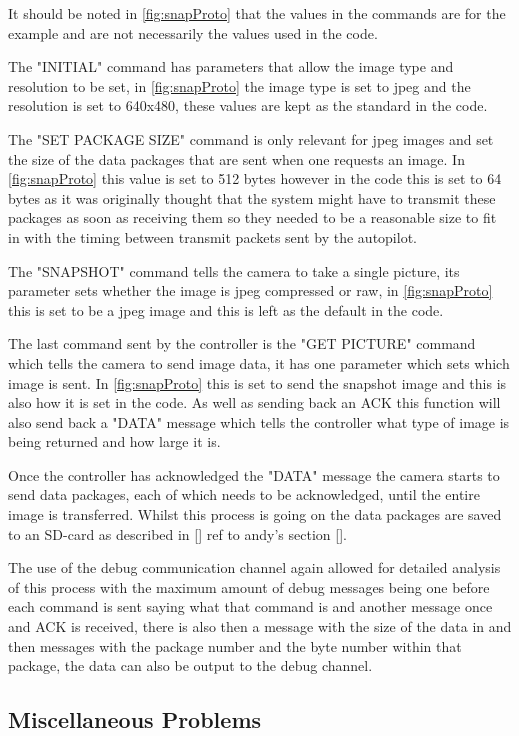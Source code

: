 It should be noted in \ref{fig:snapProto} that the values in the commands are for the example and are not necessarily the values used in the code.

The "INITIAL" command has parameters that allow the image type and resolution to be set, in \ref{fig:snapProto} the image type is set to jpeg and the resolution is set to 640x480, these values are kept as the standard in the code.

The "SET PACKAGE SIZE" command is only relevant for jpeg images and set the size of the data packages that are sent when one requests an image. In \ref{fig:snapProto} this value is set to 512 bytes however in the code this is set to 64 bytes as it was originally thought that the system might have to transmit these packages as soon as receiving them so they needed to be a reasonable size to fit in with the timing between transmit packets sent by the autopilot.

The "SNAPSHOT" command tells the camera to take a single picture, its parameter sets whether the image is jpeg compressed or raw, in \ref{fig:snapProto} this is set to be a jpeg image and this is left as the default in the code.

The last command sent by the controller is the "GET PICTURE" command which tells the camera to send image data, it has one parameter which sets which image is sent. In \ref{fig:snapProto} this is set to send the snapshot image and this is also how it is set in the code. As well as sending back an ACK this function will also send back a "DATA" message which tells the controller what type of image is being returned and how large it is.

Once the controller has acknowledged the "DATA" message the camera starts to send data packages, each of which needs to be acknowledged, until the entire image is transferred. Whilst this process is going on the data packages are saved to an SD-card as described in [] ref to andy's section [].

The use of the debug communication channel again allowed for detailed analysis of this process with the maximum amount of debug messages being one before each command is sent saying what that command is and another message once and ACK is received, there is also then a message with the size of the data in and then messages with the package number and the byte number within that package, the data can also be output to the debug channel.

\subsection{Miscellaneous Problems}

